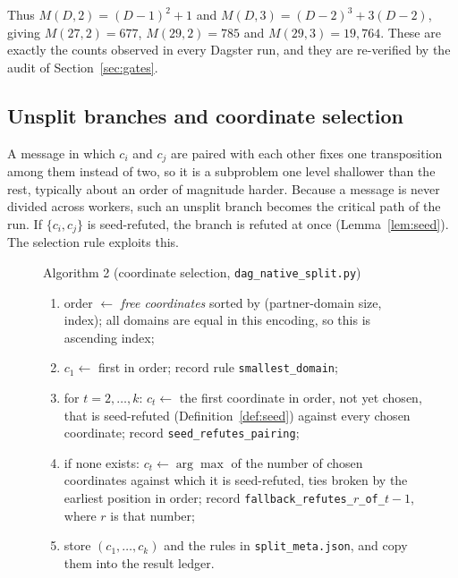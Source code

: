 \documentclass[11pt,a4paper]{article}
\theoremstyle{definition}
\newcommand{\code}[1]{\texttt{#1}}
\begin{document}
Thus $M(D,2)=(D-1)^2+1$ and $M(D,3)=(D-2)^3+3(D-2)$, giving $M(27,2)=677$,
$M(29,2)=785$ and $M(29,3)=19{,}764$. These are exactly the counts observed in every Dagster
run, and they are re-verified by the audit of Section~\ref{sec:gates}.

\subsection{Unsplit branches and coordinate selection}\label{sec:rule}

A message in which $c_i$ and $c_j$ are paired with each other fixes one transposition among
them instead of two, so it is a subproblem one level shallower than the rest, typically
about an order of magnitude harder. Because a message is never divided across workers, such
an unsplit branch becomes the critical path of the run. If $\{c_i,c_j\}$ is
seed-refuted, the branch is refuted at once (Lemma~\ref{lem:seed}). The selection rule
exploits this.

\begin{figure}[H]
\centering
\begin{minipage}{0.92\linewidth}\small
Algorithm 2 (coordinate selection, \code{dag\_native\_split.py})\label{alg:sel}
\begin{enumerate}[nosep, label=\arabic*.]
\item order $\leftarrow$ \emph{free coordinates} sorted by (partner-domain size, index); all domains
are equal in this encoding, so this is ascending index;
\item $c_1\leftarrow$ first in order; record rule \code{smallest\_domain};
\item for $t=2,\dots,k$: $c_t\leftarrow$ the first coordinate in order, not yet chosen, that is
seed-refuted (Definition~\ref{def:seed}) against every chosen coordinate; record
\code{seed\_refutes\_pairing};
\item if none exists: $c_t\leftarrow\arg\max$ of the number of chosen coordinates against which
it is seed-refuted, ties broken by the earliest position in order; record
\code{fallback\_refutes\_}$r$\code{\_of\_}$t{-}1$, where $r$ is that number;
\item store $(c_1,\dots,c_k)$ and the rules in \code{split\_meta.json}, and copy them into the
result ledger.
\end{enumerate}
\end{minipage}
\end{figure}
\end{document}
